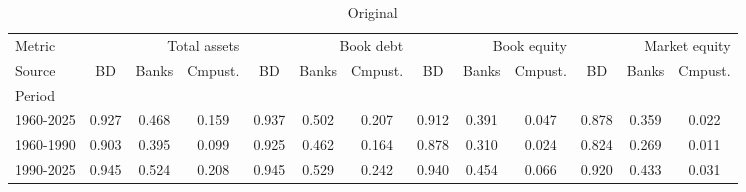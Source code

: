 
    \begin{table}[htbp]
    \centering
    \caption{Original}
    \label{tab:Table 2}
    \small
    \begin{tabular}{lcccccccccccc}
\toprule
Metric & \multicolumn{3}{r}{Total assets} & \multicolumn{3}{r}{Book debt} & \multicolumn{3}{r}{Book equity} & \multicolumn{3}{r}{Market equity} \\
Source & BD & Banks & Cmpust. & BD & Banks & Cmpust. & BD & Banks & Cmpust. & BD & Banks & Cmpust. \\
Period &  &  &  &  &  &  &  &  &  &  &  &  \\
\midrule
1960-2025 & 0.927 & 0.468 & 0.159 & 0.937 & 0.502 & 0.207 & 0.912 & 0.391 & 0.047 & 0.878 & 0.359 & 0.022 \\
1960-1990 & 0.903 & 0.395 & 0.099 & 0.925 & 0.462 & 0.164 & 0.878 & 0.310 & 0.024 & 0.824 & 0.269 & 0.011 \\
1990-2025 & 0.945 & 0.524 & 0.208 & 0.945 & 0.529 & 0.242 & 0.940 & 0.454 & 0.066 & 0.920 & 0.433 & 0.031 \\
\bottomrule
\end{tabular}

    \end{table}
    